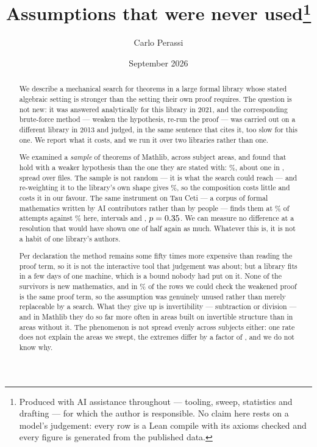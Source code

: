 \documentclass[11pt]{article}
\title{Assumptions that were never used\thanks{Produced with AI assistance throughout --- tooling, sweep, statistics and drafting --- for which the author is responsible. No claim here rests on a model's judgement: every row is a Lean compile with its axioms checked and every figure is generated from the published data.}}
\author{Carlo Perassi}
\date{September 2026}
\begin{document}
\maketitle



\begin{abstract}
We describe a mechanical search for theorems in a large formal library whose
stated algebraic setting is stronger than the setting their own proof requires.
The question is not new: it was answered analytically for this library in 2021,
and the corresponding brute-force method --- weaken the hypothesis, re-run the
proof --- was carried out on a different library in 2013 and judged, in the same
sentence that cites it, too slow for this one. We report what it costs, and we
run it over two libraries rather than one.

We examined a \emph{sample} of \theoremsExamined{} theorems of Mathlib, across
\allAreasWord{} subject areas, and found \theoremsWeakened{} that hold with a
weaker hypothesis than the one they are stated with: \theoremRate{}\%, about one
in \theoremOneIn{}, spread over \theoremFiles{} files. The sample is not random --- it is what the search could reach --- and
re-weighting it to the library's own shape gives \reweightedRate{}\%, so the
composition costs little and costs it in our favour. The same instrument on Tau Ceti
\cite{tauceti} --- a corpus of formal mathematics written by AI contributors
rather than by people --- finds them at \tauYield{}\% of attempts against
\allYield{}\% here, intervals \tauYieldCI{} and \allYieldCI{}, $p =
0.35{}$. We can measure no difference at a resolution that would have
shown one of half again as much. Whatever this is, it is not a habit of one
library's authors.

Per declaration the method remains some fifty times more expensive than reading
the proof term, so it is not the interactive tool that judgement was about; but
a library fits in a few days of one machine, which is a bound nobody had put on
it. None of the survivors is new mathematics, and in \unusedPercent{}\% of the
rows we could check the weakened proof is the same proof term, so the assumption
was genuinely unused rather than merely replaceable by a search. What they give
up is invertibility --- subtraction or division --- and in Mathlib they do so
far more often in
areas built on invertible structure than in areas without it. The phenomenon is
not spread evenly across subjects either: one rate does not explain the areas we
swept, the extremes differ by a factor of \densitySpread{}, and we do not know
why.
\end{abstract}
\end{document}
